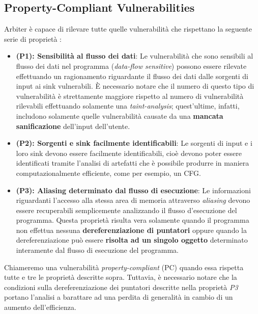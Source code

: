 \documentclass[../main.tex]{subfiles}
\begin{document}
\subsection{Property-Compliant Vulnerabilities}
Arbiter è capace di rilevare tutte quelle vulnerabilità che rispettano la seguente serie di proprietà \cite{Arbier}:
\begin{itemize}
    \item \textbf{(P1): Sensibilità al flusso dei dati}: Le vulnerabilità che sono sensibili al flusso dei dati nel programma (\textit{data-flow sensitive}) possono essere rilevate effettuando
    un ragionamento riguardante il flusso dei dati dalle sorgenti di input ai sink vulnerabili. È necessario notare che il numero di questo tipo di vulnerabilità è strettamente maggiore rispetto al numero di vulnerabilità
    rilevabili effettuando solamente una \textit{taint-analysis}; quest'ultime, infatti, includono solamente quelle vulnerabilità causate da una \textbf{mancata sanificazione} dell'input dell'utente.
    \item \textbf{(P2): Sorgenti e sink facilmente identificabili}: Le sorgenti di input e i loro sink devono essere facilmente identificabili, cioè devono poter essere identificati tramite l'analisi di artefatti che è possibile
    produrre in maniera computazionalmente efficiente, come per esempio, un CFG.
    \item \textbf{(P3): Aliasing determinato dal flusso di esecuzione}: Le informazioni riguardanti l'accesso alla stessa area di memoria attraverso \textit{aliasing} devono essere recuperabili semplicemente analizzando il flusso d'esecuzione del programma.
    Questa proprietà risulta vera solamente quando il programma non effettua nessuna \textbf{dereferenziazione di puntatori} oppure quando la dereferenziazione può essere \textbf{risolta ad un singolo oggetto} determinato interamente dal flusso di esecuzione del programma.
\end{itemize}
Chiameremo una vulnerabilità \textit{property-compliant} (PC) quando essa rispetta tutte e tre le proprietà descritte sopra. Tuttavia, è necessario notare che la condizioni sulla dereferenziazione dei puntatori descritte nella proprietà \textit{P3} portano
l'analisi a barattare ad una perdita di generalità in cambio di un aumento dell'efficienza.
\end{document}
